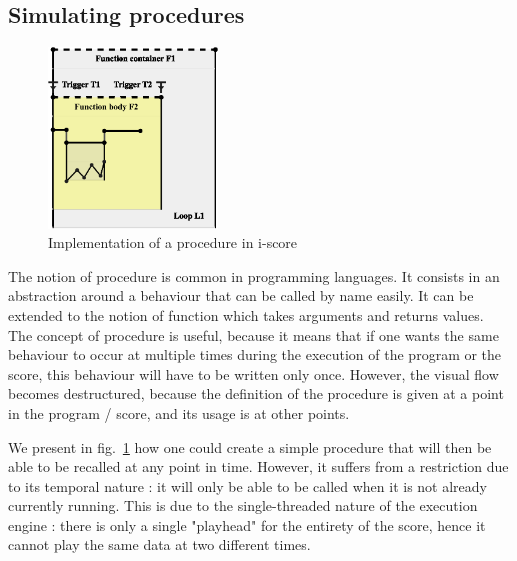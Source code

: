 \documentclass{article}
\begin{document}
\subsection{Simulating procedures}

\begin{figure}
\centering
\includegraphics[width=0.40\textwidth]{images/function.eps}
\caption{Implementation of a procedure in i-score}
\label{fig.function}
\end{figure}

The notion of procedure is common in programming languages.
It consists in an abstraction around a behaviour that can be called 
by name easily.
It can be extended to the notion of function which takes arguments 
and returns values.
The concept of procedure is useful, because it means that 
if one wants the same behaviour to occur at multiple times during
the execution of the program or the score, this behaviour will 
have to be written only once.
However, the visual flow becomes destructured, because 
the definition of the procedure is given at a point in the program / score, 
and its usage is at other points.

We present in fig.~\ref{fig.function} how one could create a simple 
procedure that will then be able to be recalled at any point in time.
However, it suffers from a restriction due to its temporal nature : 
it will only be able to be called when it is not already currently running. 
This is due to the single-threaded nature of the execution engine : there is 
only a single "playhead" for the entirety of the score, hence it cannot play the 
same data at two different times.
\end{document}
